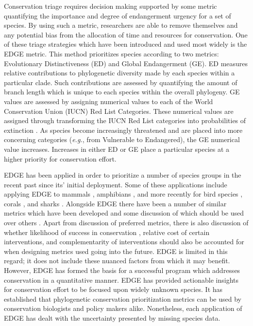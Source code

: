 \documentclass[12pt,english]{article}
\begin{document}
Conservation triage requires decision making supported by some metric
quantifying the importance and degree of endangerment urgency for a set of
species. By using such a metric, researchers are able to remove themselves and
any potential bias from the allocation of time and resources for conservation.
One of these triage strategies which have been introduced and used most widely
is the EDGE metric\autocite[Evolutionary Distinction and Globally
Endangered;][]{Isaac2007}. This method prioritizes species according to two
metrics: Evolutionary Distinctiveness (ED) and Global Endangerment (GE). ED
measures relative contributions to phylogenetic diversity made by each species
within a particular clade\autocite{Isaac2007}. Such contributions are assessed
by quantifying the amount of branch length which is unique to each species
within the overall phylogeny. GE values are assessed by assigning numerical
values to each of the World Conservation Union (IUCN) Red List Categories. These
numerical values are assigned through transforming the IUCN Red List categories
into probabilities of extinction \autocite{Mooers2008}. As species become
increasingly threatened and are placed into more concerning categories
(\emph{e.g.}, from Vulnerable to Endangered), the GE numerical value increases.
Increases in either ED or GE place a particular species at a higher priority for
conservation effort.

EDGE has been applied in order to prioritize a number of species groups in the
recent past since its' initial deployment. Some of these applications include
applying EDGE to mammals \autocite{Isaac2007}, amphibians \autocite{Isaac2012},
and more recently for bird species \autocite{Jetz2014}, corals
\autocite{Curnick2015}, and sharks \autocite{Stein2018}. Alongside EDGE there
have been a number of similar metrics which have been developed and some
discussion of which should be used over others \autocite{Steel2007, Pearse2015}.
Apart from discussion of preferred metrics, there is also discussion of whether
likelihood of success in conservation \autocite{Wilson2007, Mcbride2007},
relative cost of certain interventions\autocite{Naidoo2006}, and complementarity
of interventions\autocite{Pressey1993, Myers2000} should also be accounted for
when designing metrics used going into the future. EDGE is limited in this
regard; it does not include these nuanced factors from which it may benefit.
However, EDGE has formed the basis for a successful program which addresses
conservation in a quantitative manner. EDGE has provided actionable insights for
conservation effort to be focused upon widely unknown species. It has
established that phylogenetic conservation prioritization metrics can be used by
conservation biologists and policy makers alike. Nonetheless, each application
of EDGE has dealt with the uncertainty presented by missing species data.
\end{document}
